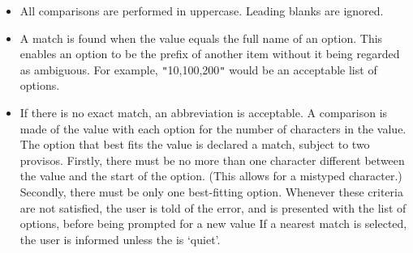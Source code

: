 \documentclass[twoside,11pt,nolof]{starlink}
\begin{document}
{{      \begin{itemize}
         \item All comparisons are performed in uppercase.  Leading blanks
         are ignored.
         \item A match is found when the value equals the full name of an
         option.  This enables an option to be the prefix of another
         item without it being regarded as ambiguous.  For example,
         \texttt{"}10,100,200\texttt{"} would be an acceptable list of options.
         \item If there is no exact match, an abbreviation is acceptable.
         A comparison is made of the value with each option for the
         number of characters in the value.  The option that best fits
         the value is declared a match, subject to two provisos.
         Firstly, there must be no more than one character different
         between the value and the start of the option.  (This allows
         for a mistyped character.)  Secondly, there must be only one
         best-fitting option.  Whenever these criteria are not
         satisfied, the user is told of the error, and is presented
         with the list of options, before being prompted for a new value
         If a nearest match is selected, the user is informed unless the
 is `quiet'.
         \end{itemize}
   }
}
\end{document}
